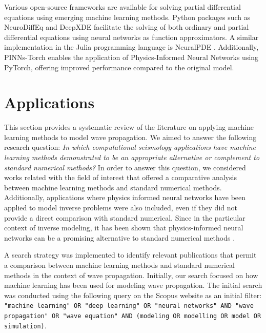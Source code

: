 \documentclass[11pt,twoside]{article}
\begin{document}
Various open-source frameworks are available for solving partial differential equations using emerging machine learning methods. Python 
packages such as NeuroDiffEq \citep{chen2020neurodiffeq} and DeepXDE \citep{lu2021deepxde} facilitate the solving of both ordinary and 
partial differential equations using neural networks as function approximators. A similar implementation in the Julia programming language 
is NeuralPDE \citep{https://doi.org/10.48550/arxiv.2107.09443}. Additionally, PINNs-Torch \citep{bafghi_pinns-torch_2023} enables the 
application of Physics-Informed Neural Networks using PyTorch, offering improved performance compared to the original model.

\section{Applications}\label{sec:applications}

This section provides a systematic review of the literature on applying machine learning methods to model 
wave propagation. We aimed to answer the following research question: \textit{In which computational 
seismology applications have machine learning methods demonstrated to be an appropriate alternative or
complement to standard numerical methods?} In order to answer this question, we considered works related 
with the field of interest that offered a comparative analysis between machine learning methods and standard
numerical methods. Additionally, applications where physics informed neural networks have been applied to model
inverse problems were also included, even if they did not provide a direct comparison with standard numerical. 
Since in the particular context of inverse modeling, it has been shown that physics-informed neural networks 
can be a promising alternative to standard numerical methods \citep{haghighat_physics-informed_2021,
raissi_hidden_2020}.

A search strategy was implemented to identify relevant publications that permit a comparison between machine 
learning methods and standard numerical methods in the context of wave propagation. Initially, our search focused 
on how machine learning has been used for modeling wave propagation. The initial search was conducted using the 
following query on the Scopus website as an initial filter: \texttt{"machine learning" OR "deep learning" OR 
"neural networks" AND "wave propagation" OR "wave equation" AND (modeling OR modelling OR model OR simulation)}.
\end{document}
